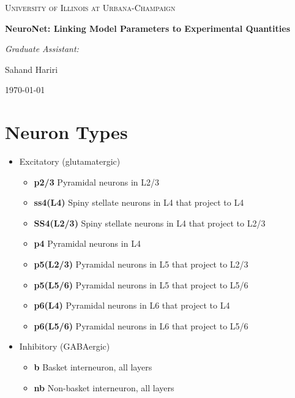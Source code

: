 \documentclass{article}
\begin{document}
	
\begin{titlepage}
	\centering
	{\scshape\LARGE University of Illinois at Urbana-Champaign \par}
	\vspace{4cm}
	\vspace{3cm}
	{\huge\bfseries NeuroNet: Linking Model Parameters to Experimental Quantities\par}
	\vspace{8cm}

	{\itshape Graduate Assistant:\par}
	{\Large Sahand Hariri\par}

	\vfill
	\vfill
	
	{\large \today\par}
\end{titlepage}

\section{Neuron Types}

\begin{itemize}
	\item Excitatory (glutamatergic)
		\begin{itemize}
			\item \textbf{p2/3} Pyramidal neurons in L2/3
			\item \textbf{ss4(L4)} Spiny stellate neurons in L4 that project to L4
			\item \textbf{SS4(L2/3)} Spiny stellate neurons in L4 that project to L2/3
			\item \textbf{p4} Pyramidal neurons in L4
			\item \textbf{p5(L2/3)} Pyramidal neurons in L5 that project to L2/3
			\item \textbf{p5(L5/6)} Pyramidal neurons in L5 that project to L5/6
			\item \textbf{p6(L4)} Pyramidal neurons in L6 that project to L4
			\item \textbf{p6(L5/6)} Pyramidal neurons in L6 that project to L5/6
		\end{itemize}
	\item Inhibitory (GABAergic)
		\begin{itemize}
			\item \textbf{b} Basket interneuron, all layers
			\item \textbf{nb} Non-basket interneuron, all layers
		\end{itemize}
\end{itemize}
\end{document}
